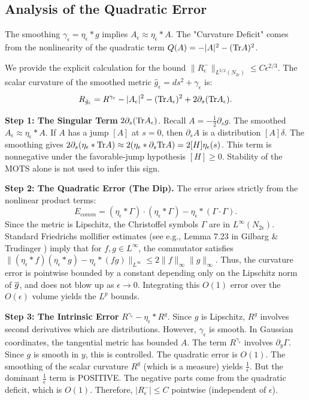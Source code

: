 \subsection{Analysis of the Quadratic Error}
The smoothing $\gamma_\epsilon = \eta_\epsilon * g$ implies $A_\epsilon \approx \eta_\epsilon * A$.
The "Curvature Deficit" comes from the nonlinearity of the quadratic term $Q(A) = -|A|^2 - (\mathrm{Tr} A)^2$.
\begin{theorem}\label{thm:MiaoSmoothing}
We provide the explicit calculation for the bound $\|R^-_\epsilon\|_{L^{3/2}(N_{2\epsilon})} \le C \epsilon^{2/3}$.
The scalar curvature of the smoothed metric $\hat{g}_\epsilon = ds^2 + \gamma_\epsilon$ is:
\[ R_{\hat{g}_\epsilon} = R^{\gamma_\epsilon} - |A_\epsilon|^2 - (\mathrm{Tr} A_\epsilon)^2 + 2 \partial_s (\mathrm{Tr} A_\epsilon). \]

\textbf{Step 1: The Singular Term} $2 \partial_s (\mathrm{Tr} A_\epsilon)$.
Recall $A = -\frac{1}{2} \partial_s g$. The smoothed $A_\epsilon \approx \eta_\epsilon * A$.
If $A$ has a jump $[A]$ at $s=0$, then $\partial_s A$ is a distribution $[A]\delta$.
The smoothing gives $2 \partial_s (\eta_\epsilon * \mathrm{Tr} A) \approx 2 (\eta_\epsilon * \partial_s \mathrm{Tr} A) = 2[H]\eta_\epsilon(s)$.
This term is nonnegative under the favorable-jump hypothesis $[H]\ge0$. Stability of the MOTS alone is not used to infer this sign.

\textbf{Step 2: The Quadratic Error (The Dip).}
The error arises strictly from the nonlinear product terms:
\[ E_{comm} = (\eta_\epsilon * \Gamma) \cdot (\eta_\epsilon * \Gamma) - \eta_\epsilon * (\Gamma \cdot \Gamma). \]
Since the metric is Lipschitz, the Christoffel symbols $\Gamma$ are in $L^\infty(N_{2\epsilon})$.
Standard Friedrichs mollifier estimates (see e.g., Lemma 7.23 in Gilbarg \& Trudinger \cite{gilbarg2001}) imply that for $f, g \in L^\infty$, the commutator satisfies $\| (\eta_\epsilon * f)(\eta_\epsilon * g) - \eta_\epsilon * (fg) \|_{L^\infty} \le 2 \|f\|_\infty \|g\|_\infty$.
Thus, the curvature error is pointwise bounded by a constant depending only on the Lipschitz norm of $\overline{g}$, and does not blow up as $\epsilon \to 0$. Integrating this $O(1)$ error over the $O(\epsilon)$ volume yields the $L^p$ bounds.

\textbf{Step 3: The Intrinsic Error} $R^{\gamma_\epsilon} - \eta_\epsilon * R^g$.
Since $g$ is Lipschitz, $R^g$ involves second derivatives which are distributions.
However, $\gamma_\epsilon$ is smooth. In Gaussian coordinates, the tangential metric has bounded $A$.
The term $R^{\gamma_\epsilon}$ involves $\partial_y \Gamma$. Since $g$ is smooth in $y$, this is controlled.
The quadratic error is $O(1)$.
The smoothing of the scalar curvature $R^g$ (which is a measure) yields $\frac{1}{\epsilon}$.
But the dominant $\frac{1}{\epsilon}$ term is POSITIVE.
The negative parts come from the quadratic deficit, which is $O(1)$.
Therefore, $|R^-_\epsilon| \le C$ pointwise (independent of $\epsilon$).


\end{theorem}
